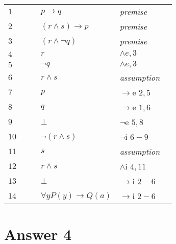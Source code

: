 \documentclass[12pt]{article}
\begin{document}
\begin{table}[H]
	\centering

	\begin{tabular}{*6{l}}
		$1$ & & & $ p \rightarrow q $ & \textit{premise} & \\

		$2$ & & & $(r \wedge s) \rightarrow p $ &\textit{premise} &\\

		$3$ & & & $(r \wedge \neg q) $ &\textit{premise} &\\

		$4$ & & & $ r $ &\textit{$\wedge e,3$} &\\

		$5$ & & & $ \neg q $ &\textit{$\wedge e,3$} &\\ \cline{2-6}

		$6$ &\multicolumn{1}{|c}{}& & $r \wedge s$ & {\textit{assumption}} & \multicolumn{1}{c|}{}\\

		$7$ &\multicolumn{1}{|c}{} & & $p $ & $\rightarrow$e $2,5$ & \multicolumn{1}{c|}{}\\

		$8$ &\multicolumn{1}{|c}{} & & $q $ & $\rightarrow$e $1,6$ & \multicolumn{1}{c|}{}\\

		$9$ &\multicolumn{1}{|c}{}& & $ \bot$ & {$\neg$e $5,8$}&\multicolumn{1}{c|}{}\\\cline{2-6}

		$10$ & & & $\neg(r\wedge s)$ & {$\neg$i $6-9$}& \\ \cline{2-6}

		$11$ &\multicolumn{1}{|c}{}& &$s$ & {\textit{assumption}} &\multicolumn{1}{c|}{}\\

		$12$ &\multicolumn{1}{|c}{}& & $r\wedge s$ & $\wedge$i $4,11$ & \multicolumn{1}{c|}{}\\

		$13$ &\multicolumn{1}{|c}{} & & $\bot$ & $\rightarrow$i $2-6$ & \multicolumn{1}{c|}{}\\ \cline{2-6}

		$14$ & & & $\forall y P(y) \rightarrow Q(a)$ & $\rightarrow$i $2-6$ & \\

	\end{tabular}
\end{table}

\section*{Answer 4}
\end{document}
